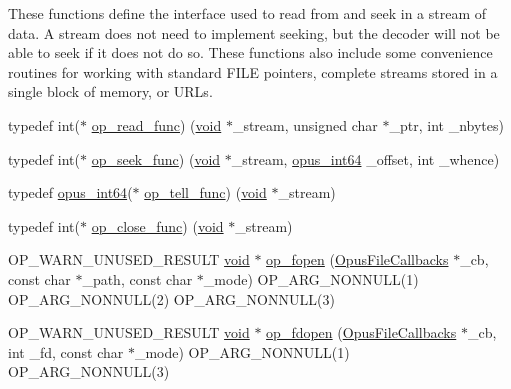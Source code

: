 These functions define the interface used to read from and seek in a stream of data. A stream does not need to implement seeking, but the decoder will not be able to seek if it does not do so. These functions also include some convenience routines for working with standard {\ttfamily F\+I\+LE} pointers, complete streams stored in a single block of memory, or U\+R\+Ls. \begin{DoxyCompactItemize}
\item 
typedef int($\ast$ \mbox{\hyperlink{group__stream__callbacks_ga9ffca429db1f3b77f2f303f1942188c3}{op\+\_\+read\+\_\+func}}) (\mbox{\hyperlink{_s_d_l__opengles2__gl2ext_8h_ae5d8fa23ad07c48bb609509eae494c95}{void}} $\ast$\+\_\+stream, unsigned char $\ast$\+\_\+ptr, int \+\_\+nbytes)
\item 
typedef int($\ast$ \mbox{\hyperlink{group__stream__callbacks_gae57cb396d1f193d3f4e7e56ddad7760e}{op\+\_\+seek\+\_\+func}}) (\mbox{\hyperlink{_s_d_l__opengles2__gl2ext_8h_ae5d8fa23ad07c48bb609509eae494c95}{void}} $\ast$\+\_\+stream, \mbox{\hyperlink{opus__types_8h_ab6742070cf9d0ccffca2b80522b4f41a}{opus\+\_\+int64}} \+\_\+offset, int \+\_\+whence)
\item 
typedef \mbox{\hyperlink{opus__types_8h_ab6742070cf9d0ccffca2b80522b4f41a}{opus\+\_\+int64}}($\ast$ \mbox{\hyperlink{group__stream__callbacks_gaca012812dea4bc3a27b0c23575efecaf}{op\+\_\+tell\+\_\+func}}) (\mbox{\hyperlink{_s_d_l__opengles2__gl2ext_8h_ae5d8fa23ad07c48bb609509eae494c95}{void}} $\ast$\+\_\+stream)
\item 
typedef int($\ast$ \mbox{\hyperlink{group__stream__callbacks_ga16c914ec90d301f125cdbeaa1ff57c2d}{op\+\_\+close\+\_\+func}}) (\mbox{\hyperlink{_s_d_l__opengles2__gl2ext_8h_ae5d8fa23ad07c48bb609509eae494c95}{void}} $\ast$\+\_\+stream)
\item 
O\+P\+\_\+\+W\+A\+R\+N\+\_\+\+U\+N\+U\+S\+E\+D\+\_\+\+R\+E\+S\+U\+LT \mbox{\hyperlink{_s_d_l__opengles2__gl2ext_8h_ae5d8fa23ad07c48bb609509eae494c95}{void}} $\ast$ \mbox{\hyperlink{group__stream__callbacks_ga8b3714e33b1459b43445b99b55cbe75f}{op\+\_\+fopen}} (\mbox{\hyperlink{struct_opus_file_callbacks}{Opus\+File\+Callbacks}} $\ast$\+\_\+cb, const char $\ast$\+\_\+path, const char $\ast$\+\_\+mode) O\+P\+\_\+\+A\+R\+G\+\_\+\+N\+O\+N\+N\+U\+LL(1) O\+P\+\_\+\+A\+R\+G\+\_\+\+N\+O\+N\+N\+U\+LL(2) O\+P\+\_\+\+A\+R\+G\+\_\+\+N\+O\+N\+N\+U\+LL(3)
\item 
O\+P\+\_\+\+W\+A\+R\+N\+\_\+\+U\+N\+U\+S\+E\+D\+\_\+\+R\+E\+S\+U\+LT \mbox{\hyperlink{_s_d_l__opengles2__gl2ext_8h_ae5d8fa23ad07c48bb609509eae494c95}{void}} $\ast$ \mbox{\hyperlink{group__stream__callbacks_gac1843b587e14570e616f8cc7c4501961}{op\+\_\+fdopen}} (\mbox{\hyperlink{struct_opus_file_callbacks}{Opus\+File\+Callbacks}} $\ast$\+\_\+cb, int \+\_\+fd, const char $\ast$\+\_\+mode) O\+P\+\_\+\+A\+R\+G\+\_\+\+N\+O\+N\+N\+U\+LL(1) O\+P\+\_\+\+A\+R\+G\+\_\+\+N\+O\+N\+N\+U\+LL(3)

\end{DoxyCompactItemize}
